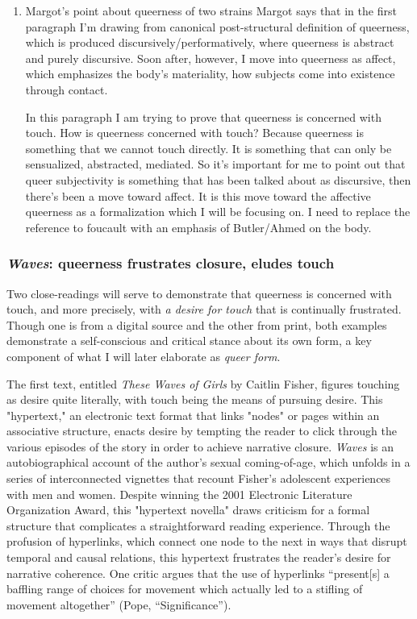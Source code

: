 \documentclass[11pt]{article}
\begin{document}
\begin{enumerate}
\item Margot's point about queerness of two strains
\label{sec:org2f08e8c}
Margot says that in the first paragraph I'm drawing from canonical
post-structural definition of queerness, which is produced
discursively/performatively, where queerness is abstract and purely
discursive. Soon after, however, I move into queerness as affect,
which emphasizes the body's materiality, how subjects come into
existence through contact.

In this paragraph I am trying to prove that queerness is concerned
with touch. How is queerness concerned with touch? Because queerness
is something that we cannot touch directly. It is something that can
only be sensualized, abstracted, mediated. So it's important for me to
point out that queer subjectivity is something that has been talked
about as discursive, then there's been a move toward affect. It is
this move toward the affective queerness as a formalization which I
will be focusing on. I need to replace the reference to foucault with
an emphasis of Butler/Ahmed on the body.
\end{enumerate}

\subsubsection{\emph{Waves}: queerness frustrates closure, eludes touch}
\label{sec:orgc1a0859}

Two close-readings will serve to demonstrate that queerness is
concerned with touch, and more precisely, with \emph{a desire for touch}
that is continually frustrated. Though one is from a digital source
and the other from print, both examples demonstrate a self-conscious
and critical stance about its own form, a key component of what I will
later elaborate as \emph{queer form}.

The first text, entitled \emph{These Waves of Girls} by Caitlin Fisher,
figures touching as desire quite literally, with touch being the means
of pursuing desire. This "hypertext," an electronic text format that
links "nodes" or pages within an associative structure, enacts desire
by tempting the reader to click through the various episodes of the
story in order to achieve narrative closure. \emph{Waves} is an
autobiographical account of the author's sexual coming-of-age, which
unfolds in a series of interconnected vignettes that recount Fisher's
adolescent experiences with men and women. Despite winning the 2001
Electronic Literature Organization Award, this "hypertext novella"
draws criticism for a formal structure that complicates a
straightforward reading experience. Through the profusion of
hyperlinks, which connect one node to the next in ways that disrupt
temporal and causal relations, this hypertext frustrates the reader’s
desire for narrative coherence. One critic argues that the
use of hyperlinks “present[s] a baffling range of choices for movement
which actually led to a stifling of movement altogether” (Pope,
“Significance”).
\end{document}
